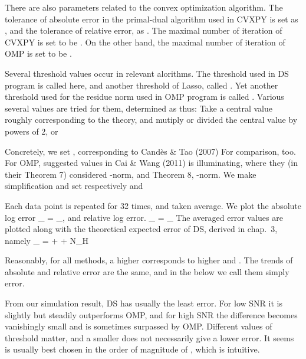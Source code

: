 There are also parameters related to the convex optimization algorithm.
The tolerance of absolute error in the primal-dual algorithm used in CVXPY is set as , and the tolerance of relative error, as .
The maximal number of iteration of CVXPY is set to be .
On the other hand, the maximal number of iteration of OMP is set to be .

Several threshold values occur in relevant alorithms.
The threshold used in DS program is called  here, and another threshold of Lasso, called \m {\a}.
Yet another threshold used for the residue norm used in OMP program is called \m {\eta}.
Various several values are tried for them, determined as thus: Take a central value roughly corresponding to the theory, and mutiply or divided the central value by powers of 2, or 

Concretely, we set , corresponding to Cand\`es \& Tao (2007)
For comparison,  too.
For OMP, suggested values in Cai \& Wang (2011) is illuminating, where they (in their Theorem 7) considered -norm, and Theorem 8, \m {\ell _\infty}-norm.
We make simplification and set respectively  and 

Each data point is repeated for 32 times, and taken average.
We plot the absolute log error
%
 {
\NC \e_{}
=\NC {} _{}, \NR
}
%
and relative log error.
%
 {
\NC \e_{}
=\NC {}
{ _{}} \NR
}
%
The averaged error values are plotted along with the theoretical expected error of DS, derived in chap.\ 3, namely
%
 {
\NC \e_{}
=\NC {} + \log {} + \log \log N_H \NR
}

\stopsubsection

\startsubsection [title={Plots}]

\stopsubsection

\startsubsection [title={Discussion}]

Reasonably, for all methods, a higher \m {\s} corresponds to higher  and .
The trends of absolute and relative error are the same, and in the below we call them simply error.

From our simulation result, DS has usually the least error.
For low SNR it is slightly but steadily outperforms OMP, and for high SNR the difference becomes vanishingly small and is sometimes surpassed by OMP.
Different values of threshold  matter, and a smaller  does not necessarily give a lower error.
It seems  is usually best chosen in the order of magnitude of \m {\s}, which is intuitive.

